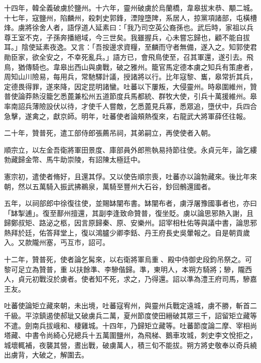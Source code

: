 \begin{pinyinscope}
 十四年，韓全義破虜於鹽州。十六年，靈州破虜於烏蘭橋，韋皋拔末恭、顒二城。十七年，寇鹽州，陷麟州，殺刺史郭鋒，湮隍墮陴，系居人，掠黨項諸部，屯橫槽烽。虜將徐舍人者，語俘道人延素曰：「我乃司空英公裔孫也。武后時，家祖以兵尊王室不克，子孫奔播絕域，今三世矣。我雖握兵，心未嘗忘歸也，顧不能自拔耳。」陰使延素夜逸。又言：「吾按邊求資糧，至麟而守者無備，遂入之。知郭使君勛臣家，欲全安之，不幸死亂兵。」語方已，會飛鳥使至，召其軍還，遂引去。飛鳥，猶傳騎也。韋皋出西山與虜戰，破之雅州。籠官馬定德本虜之知兵有策慮者，周知山川險易，每用兵，常馳驛計議，授諸將以行。比年寇黎、巂，皋常折其兵，定德畏得罪，遂來降，因定昆明諸蠻。吐蕃以下屢叛，大侵靈州。時皋圍維州，贊普使論莽熱沒籠乞悉蓖兼松州五道節度兵馬都統、群牧大使，引兵十萬援維州。皋率南詔兵薄險設伏以待，才使千人嘗敵，乞悉蓖見兵寡，悉眾追，墮伏中，兵四合急擊，遂禽之，獻京師。明年，吐蕃使者論頰熱復來，右龍武大將軍薛伾往報。



 二十年，贊普死，遣工部侍郎張薦吊祠，其弟嗣立，再使使者入朝。



 順宗立，以左金吾衛將軍田景度、庫部員外郎熊執易持節往使。永貞元年，論乞縷勃藏歸金幣、馬牛助崇陵，有詔陳太極廷中。



 憲宗初，遣使者脩好，且還其俘。又以使告順宗喪，吐蕃亦以論勃藏來。後比年來朝，然以五萬騎入振武拂鵜泉，萬騎至豐州大石谷，鈔回鶻還國者。



 五年，以祠部郎中徐復往使，並賜缽闡布書。缽闡布者，虜浮屠豫國事者也，亦曰「缽掣逋」。復至鄯州擅還，其副李逢致命贊普，復坐貶。虜以論思邪熱入謝，且歸鄭叔矩、路泌之柩，因言原歸秦、原、安樂州。詔宰相杜佑等與議中書，論思邪熱拜於廷，佑答拜堂上，復以鴻臚少卿李銛、丹王府長史吳暈報之。自是朝貢歲入。又款隴州塞，丐互市，詔可。



 十二年，贊普死，使者論乞髯來，以右衛將軍烏重、殿中侍御史段鈞吊祭之。可黎可足立為贊普，重以扶餘準、李驂偕歸。準，東明人，本朔方騎將；驂，隴西人，貞元初戰沒於虜者。使者知不死，求之，乃得還。詔以準為澧王府司馬，驂嘉王友。



 吐蕃使論矩立藏來朝，未出境，吐蕃寇宥州，與靈州兵戰定遠城，虜不勝，斬首二千級。平涼鎮遏使郝玼又破虜兵二萬，夏州節度使田縉破其眾三千，詔留矩立藏等不遣。劍南兵拔峨和、棲雞城。十四年，乃歸矩立藏等。吐蕃節度論二摩、宰相尚塔藏、中書令尚綺心兒總兵十五萬圍鹽州，為飛梯、鵝車攻城，刺史李文悅拒之，城壞輒補，夜襲其營，晝出戰，破虜萬人，積三旬不能拔。朔方將史敬奉以奇兵繞出虜背，大破之，解圍去。




\end{pinyinscope}
